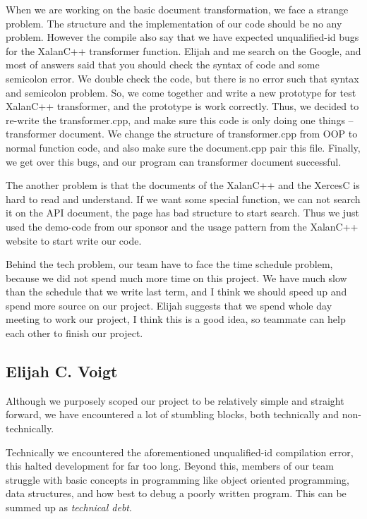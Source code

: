 When we are working on the basic document transformation, we face a strange problem.
The structure and the implementation of our code should be no any problem.
However the compile also say that we have expected unqualified-id bugs for the XalanC++ transformer function.
Elijah and me search on the Google, and most of answers said that you should check the syntax of code and some semicolon error.
We double check the code, but there is no error such that syntax and semicolon problem.
So, we come together and write a new prototype for test XalanC++ transformer, and the prototype is work correctly.
Thus, we decided to re-write the transformer.cpp, and make sure this code is only doing one things -- transformer document.
We change the structure of transformer.cpp from OOP to normal function code, and also make sure the document.cpp pair this file.
Finally, we get over this bugs, and our program can transformer document successful. 

The another problem is that the documents of the XalanC++ and the XercesC is hard to read and understand.
If we want some special function, we can not search it on the API document, the page has bad structure to start search.
Thus we just used the demo-code from our sponsor and the usage pattern from the XalanC++ website to start write our code.

Behind the tech problem, our team have to face the time schedule problem, because we did not spend much more time on this project.
We have much slow than the schedule that we write last term, and I think we should speed up and spend more source on our project.
Elijah suggests that we spend whole day meeting to work our project, I think this is a good idea, so teammate can help each other to finish our project.


\subsection{Elijah C. Voigt}

Although we purposely scoped our project to be relatively simple and straight forward, we have encountered a lot of stumbling blocks, both technically and non-technically.

Technically we encountered the aforementioned unqualified-id compilation error, this halted development for far too long.
Beyond this, members of our team struggle with basic concepts in programming like object oriented programming, data structures, and how best to debug a poorly written program.
This can be summed up as \textit{technical debt}.

